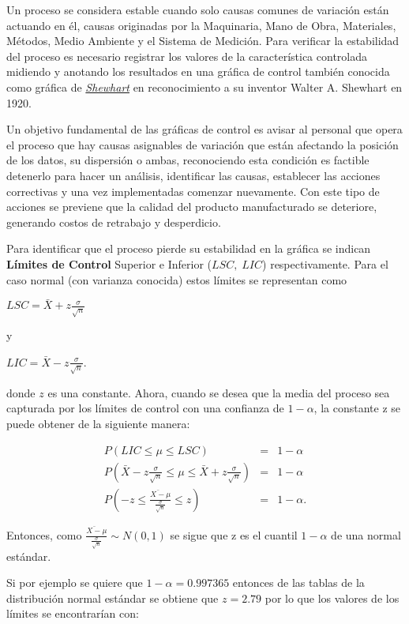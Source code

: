 \documentclass[english]{report}
\begin{document}
Un proceso se considera estable cuando solo causas comunes de variación
están actuando en él, causas originadas por la Maquinaria, Mano de
Obra, Materiales, Métodos, Medio Ambiente y el Sistema de Medición.
Para verificar la estabilidad del proceso es necesario registrar los
valores de la característica controlada midiendo y anotando los resultados
en una gráfica de control también conocida como gráfica de \emph{\uline{Shewhart}}
en reconocimiento a su inventor Walter A. Shewhart en 1920.

Un objetivo fundamental de las gráficas de control es avisar al personal
que opera el proceso que hay causas asignables de variación que están
afectando la posición de los datos, su dispersión o ambas, reconociendo
esta condición es factible detenerlo para hacer un análisis, identificar
las causas, establecer las acciones correctivas y una vez implementadas
comenzar nuevamente. Con este tipo de acciones se previene que la
calidad del producto manufacturado se deteriore, generando costos
de retrabajo y desperdicio.

Para identificar que el proceso pierde su estabilidad en la gráfica
se indican \textbf{Límites de Control} Superior e Inferior
($LSC,\;LIC$) respectivamente. Para el caso normal (con varianza conocida) estos
límites se representan como

$LSC=\bar{X}+z\frac{\sigma}{\sqrt{n}}$

y

$LIC=\bar{X}-z\frac{\sigma}{\sqrt{n}}$.

donde $z$ es una constante. Ahora, cuando se desea que la media del
proceso sea capturada por los límites de control con una confianza
de $1-\alpha$, la constante z se puede obtener de la siguiente
manera:


\begin{eqnarray*}
P(LIC\leq\mu\leq LSC) & = & 1-\alpha\\
P(\bar{X}-z\frac{\sigma}{\sqrt{n}}\leq\mu\leq\bar{X}+z\frac{\sigma}{\sqrt{n}}) & = & 1-\alpha\\
P(-z\leq\frac{\bar{X-}\mu}{\frac{\sigma}{\sqrt{n}}}\leq z) & = & 1-\alpha.
\end{eqnarray*}


Entonces, como $\frac{\bar{X-}\mu}{\frac{\sigma}{\sqrt{n}}}\sim N(0,1)$
se sigue que z es el cuantil $1-\alpha$ de una normal estándar.

Si por ejemplo se quiere que $1-\alpha=0.997365$ entonces de las tablas de la distribución normal estándar se obtiene que $z=2.79$
por lo que los valores de los límites se encontrarían con: 
\end{document}
